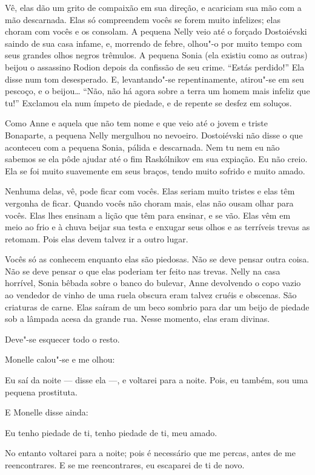 Vê, elas dão um grito de compaixão em sua direção, e acariciam sua
mão com a mão descarnada. Elas só compreendem vocês se forem muito
infelizes; elas choram com vocês e os consolam. A pequena Nelly veio até o
forçado Dostoiévski saindo de sua casa infame, e, morrendo de febre,
olhou"-o por muito tempo com seus grandes olhos negros trêmulos. A pequena
Sonia (ela existiu como as outras) beijou o assassino Rodion depois da
confissão de seu crime. “Estás perdido!” Ela disse num tom desesperado.
E, levantando"-se repentinamente, atirou"-se em seu pescoço, e o beijou\ldots{}
“Não, não há agora sobre a terra um homem mais infeliz que tu!” Exclamou
ela num ímpeto de piedade, e de repente se desfez em soluços.

Como Anne e aquela que não tem nome e que veio até o jovem e triste
Bonaparte, a pequena Nelly mergulhou no nevoeiro. Dostoiévski não disse o
que aconteceu com a pequena Sonia, pálida e descarnada. Nem tu nem eu não
sabemos se ela pôde ajudar até o fim Raskólnikov em sua expiação. Eu não
creio. Ela se foi muito suavemente em seus braços, tendo muito sofrido e
muito amado.

Nenhuma delas, vê, pode ficar com vocês. Elas seriam muito tristes e
elas têm vergonha de ficar. Quando vocês não choram mais, elas não ousam
olhar para vocês. Elas lhes ensinam a lição que têm para ensinar, e se vão.
Elas vêm em meio ao frio e à chuva beijar sua testa e enxugar seus olhos e as
terríveis trevas as retomam. Pois elas devem talvez ir a outro lugar.

Vocês só as conhecem enquanto elas são piedosas. Não se deve pensar outra
coisa. Não se deve pensar o que elas poderiam ter feito nas trevas. Nelly
na casa horrível, Sonia bêbada sobre o banco do bulevar, Anne devolvendo
o copo vazio ao vendedor de vinho de uma ruela obscura eram talvez cruéis
e obscenas. São criaturas de carne. Elas saíram de um beco sombrio para
dar um beijo de piedade sob a lâmpada acesa da grande rua. Nesse momento,
elas eram divinas.

Deve"-se esquecer todo o resto.

Monelle calou"-se e me olhou:

Eu saí da noite --- disse ela ---, e voltarei para a noite. Pois, eu também,
sou uma pequena prostituta.

E Monelle disse ainda:

Eu tenho piedade de ti, tenho piedade de ti, meu amado.

No entanto voltarei para a noite; pois é necessário que me percas,
antes de me reencontrares. E se me reencontrares, eu escaparei de ti de novo.

